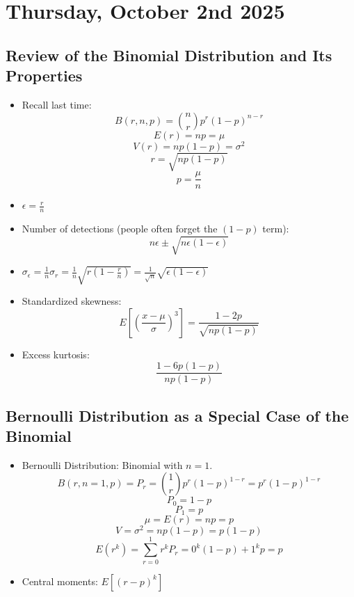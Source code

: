 \section{Thursday, October 2nd 2025}

\subsection{Review of the Binomial Distribution and Its Properties}

\begin{itemize}
      \item Recall last time:
            \[ B(r, n, p) = \binom{n}{r} p^r (1-p)^{n-r} \]
            \[ E(r) = np = \mu \]
            \[ V(r) = np(1-p) = \sigma^2 \]
            \[ r = \sqrt{np(1-p)} \]
            \[ p = \frac{\mu}{n} \]

      \item $\epsilon = \frac{r}{n}$
      \item Number of detections (people often forget the $(1-p)$ term):
            \[ n \epsilon \pm \sqrt{n \epsilon (1-\epsilon)} \]

      \item $\sigma_{\epsilon} = \frac{1}{n} \sigma_r = \frac{1}{n} \sqrt{r \left(1-\frac{r}{n}\right)} = \frac{1}{\sqrt{n}} \sqrt{\epsilon (1-\epsilon)}$

      \item Standardized skewness:
            \[ E \left[ \left( \frac{x-\mu}{\sigma} \right)^3 \right] = \frac{1-2p}{\sqrt{np(1-p)}} \]

      \item Excess kurtosis:
            \[ \frac{1-6p(1-p)}{np(1-p)} \]
\end{itemize}

\subsection{Bernoulli Distribution as a Special Case of the Binomial}

\begin{itemize}
      \item Bernoulli Distribution: Binomial with $n=1$.
            \[ B(r, n=1, p) = P_r = \binom{1}{r} p^r (1-p)^{1-r} = p^r (1-p)^{1-r} \]
            \[ P_0 = 1 - p \]
            \[ P_1 = p \]
            \[ \mu  = E(r) = np = p \]
            \[ V = \sigma^2 = np(1-p) = p(1-p) \]
            \[ E(r^k) = \sum_{r=0}^{1} r^k P_r = 0^k (1-p) + 1^k p = p \]
      \item Central moments: $E[(r-p)^k]$
\end{itemize}

